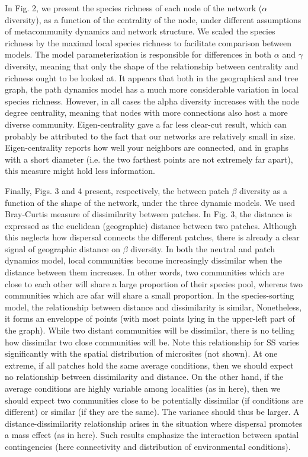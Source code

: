 \documentclass[12pt]{article}
\begin{document}
In Fig. 2, we present the species richness of each node of the network ($\alpha$
diversity), as a function of the centrality of the node, under different
assumptions of metacommunity dynamics and network structure. We scaled the
species richness by the maximal local species richness to facilitate comparison
between models. The model parameterization is responsible for differences in
both $\alpha$ and $\gamma$ diversity, meaning that only the shape of the
relationship between centrality and richness ought to be looked at.  It appears
that both in the geographical and tree graph, the path dynamics model has a
much more considerable variation in local species richness.  However, in all
cases the alpha diversity increases with the node degree centrality, meaning
that nodes with more connections also host a more diverse community.
Eigen-centrality gave a far less clear-cut result, which can probably be
attributed to the fact that our networks are relatively small in size.
Eigen-centrality reports how well your neighbors are connected, and in graphs
with a short diameter (i.e. the two farthest points are not extremely far
apart), this measure might hold less information.

Finally, Figs. 3 and 4 present, respectively, the between patch $\beta$
diversity as a function of the shape of the network, under the three dynamic
models. We used Bray-Curtis measure of dissimilarity between patches. In
Fig. 3, the distance is expressed as the euclidean (geographic) distance between
two patches. Although this neglects how dispersal connects the different
patches, there is already a clear signal of geographic distance on $\beta$
diversity. In both the neutral and patch dynamics model, local communities
become increasingly dissimilar when the distance between them increases. In
other words, two communities which are close to each other will share a large
proportion of their species pool, whereas two communities which are afar will share a
small proportion.  In the species-sorting model, the relationship between
distance and dissimilarity is similar, Nonetheless, it forms an enveloppe of
points (with most points lying in the upper-left part of the graph). While two
distant communities will be dissimilar, there is no telling how dissimilar two
close communities will be. Note this relationship for SS varies significantly
with the spatial distribution of microsites (not shown). At one extreme, if all
patches hold the same average conditions, then we should expect no relationship
between dissimilarity and distance. On the other hand, if the average conditions
are highly variable among localities (as in here), then we should expect two
communities close to be potentially dissimilar (if conditions are different) or
similar (if they are the same). The variance should thus be larger. A
distance-dissimilarity relationship arises in the situation where dispersal
promotes a mass effect (as in here). Such results emphasize the interaction
between spatial contingencies (here connectivity and distribution of
environmental conditions).  
\end{document}
